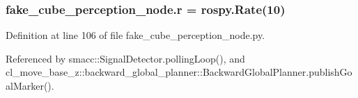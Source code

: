 \subsubsection[{\texorpdfstring{r}{r}}]{\setlength{\rightskip}{0pt plus 5cm}fake\+\_\+cube\+\_\+perception\+\_\+node.\+r = rospy.\+Rate(10)}\hypertarget{namespacefake__cube__perception__node_a36e88703ab69fd35065e8a8d9344903e}{}\label{namespacefake__cube__perception__node_a36e88703ab69fd35065e8a8d9344903e}


Definition at line 106 of file fake\+\_\+cube\+\_\+perception\+\_\+node.\+py.



Referenced by smacc\+::\+Signal\+Detector.\+polling\+Loop(), and cl\+\_\+move\+\_\+base\+\_\+z\+::backward\+\_\+global\+\_\+planner\+::\+Backward\+Global\+Planner.\+publish\+Goal\+Marker().


